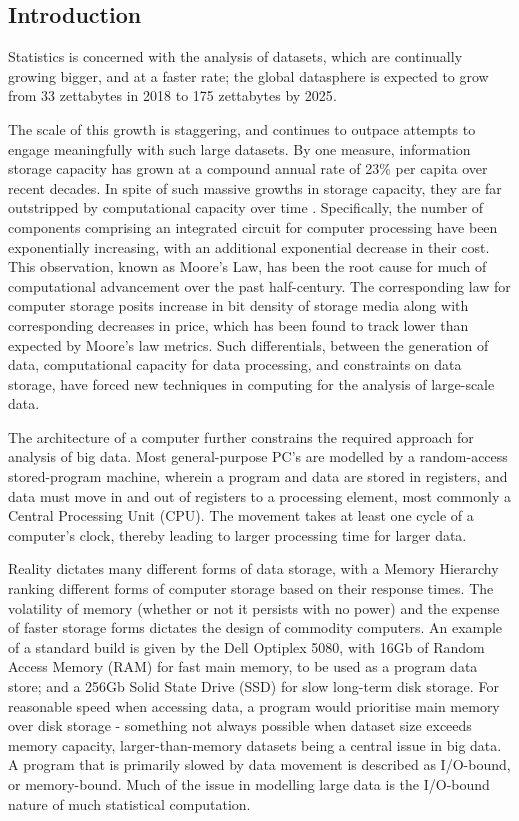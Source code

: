 \hypertarget{introduction}{%
    \subsection{Introduction}\label{introduction}}

Statistics is concerned with the analysis of datasets, which are
continually growing bigger, and at a faster rate; the global datasphere
is expected to grow from 33 zettabytes in 2018 to 175 zettabytes by
2025\cite{rydning2018digitization}.

The scale of this growth is staggering, and continues to outpace
attempts to engage meaningfully with such large datasets. By one
measure, information storage capacity has grown at a compound annual
rate of 23\% per capita over recent decades\cite{hilbert2011world}. In
spite of such massive growths in storage capacity, they are far
outstripped by computational capacity over time \cite{fontana2018moore}.
Specifically, the number of components comprising an integrated circuit
for computer processing have been exponentially increasing, with an
additional exponential decrease in their cost\cite{moore1975progress}.
This observation, known as Moore's Law, has been the root cause for much
of computational advancement over the past half-century. The
corresponding law for computer storage posits increase in bit density of
storage media along with corresponding decreases in price, which has
been found to track lower than expected by Moore's law metrics. Such
differentials, between the generation of data, computational capacity
for data processing, and constraints on data storage, have forced new
techniques in computing for the analysis of large-scale data.

The architecture of a computer further constrains the required approach
for analysis of big data. Most general-purpose PC's are modelled by a
random-access stored-program machine, wherein a program and data are
stored in registers, and data must move in and out of registers to a
processing element, most commonly a Central Processing Unit (CPU). The
movement takes at least one cycle of a computer's clock, thereby leading
to larger processing time for larger data.

Reality dictates many different forms of data storage, with a Memory
Hierarchy ranking different forms of computer storage based on their
response times\cite{toy1986computer}. The volatility of memory (whether
or not it persists with no power) and the expense of faster storage
forms dictates the design of commodity computers. An example of a
standard build is given by the Dell Optiplex 5080, with 16Gb of Random
Access Memory (RAM) for fast main memory, to be used as a program data
store; and a 256Gb Solid State Drive (SSD) for slow long-term disk
storage\cite{cornell2021standardcomp}. For reasonable speed when
accessing data, a program would prioritise main memory over disk storage
- something not always possible when dataset size exceeds memory
capacity, larger-than-memory datasets being a central issue in big data.
A program that is primarily slowed by data movement is described as
I/O-bound, or memory-bound. Much of the issue in modelling large data is
the I/O-bound nature of much statistical computation.

